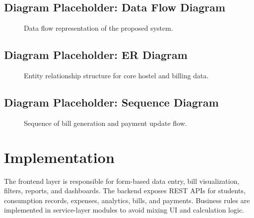 \documentclass[conference]{IEEEtran}
\begin{document}
\subsection{Diagram Placeholder: Data Flow Diagram}
\begin{figure}[H]
\centering
{}
\caption{Data flow representation of the proposed system.}
\label{fig:dfd}
\end{figure}

\subsection{Diagram Placeholder: ER Diagram}
\begin{figure}[H]
\centering
{}
\caption{Entity relationship structure for core hostel and billing data.}
\label{fig:er}
\end{figure}

\subsection{Diagram Placeholder: Sequence Diagram}
\begin{figure}[H]
\centering
{}
\caption{Sequence of bill generation and payment update flow.}
\label{fig:sequence}
\end{figure}

\section{Implementation}
The frontend layer is responsible for form-based data entry, bill visualization, filters, reports, and dashboards. The backend exposes REST APIs for students, consumption records, expenses, analytics, bills, and payments. Business rules are implemented in service-layer modules to avoid mixing UI and calculation logic.
\end{document}
